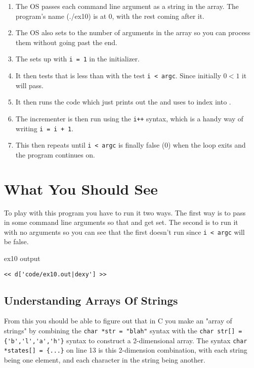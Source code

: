 \begin{enumerate}
\item The OS passes each command line argument as a string in the 
    array.  The program's name (./ex10) is at 0, with the rest coming after it.
\item The OS also sets  to the number of arguments in the 
    array so you can process them without going past the end.
\item The  sets up with \verb|i = 1| in the initializer.
\item It then tests that  is less than  with the
    test \verb|i < argc|. Since initially $0 < 1$ it will pass.
\item It then runs the code which just prints out the  and 
    uses  to index into .
\item The incrementer is then run using the \verb|i++| syntax, which is
    a handy way of writing \verb|i = i + 1|.
\item This then repeats until \verb|i < argc| is finally false (0) when
    the loop exits and the program continues on.
\end{enumerate}


\section{What You Should See}

To play with this program you have to run it two ways.  The first way is to
pass in some command line arguments so that  and 
get set.  The second is to run it with no arguments so you can see that
the first  doesn't run since \verb|i < argc| will be false.

\begin{code}{ex10 output}
\begin{lstlisting}
<< d['code/ex10.out|dexy'] >>
\end{lstlisting}
\end{code}

\subsection{Understanding Arrays Of Strings}

From this you should be able to figure out that in C you make an "array of
strings" by combining the \verb|char *str = "blah"| syntax with the
\verb|char str[] = {'b','l','a','h'}| syntax to construct a 2-dimensional
array.  The syntax \verb|char *states[] = {...}| on line 13 is this
2-dimension combination, with each string being one element, and each
character in the string being another.

